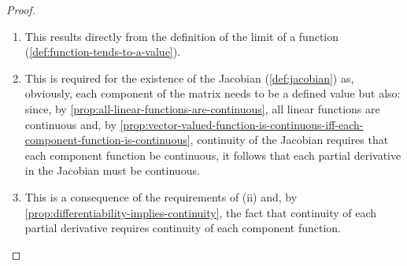 \documentclass[../MathsNotesBase.tex]{subfiles}
\begin{document}
{	
		\bigskip
		\begin{proof}\nl
			\begin{enumerate}[label=(\roman*)]
				\item This results directly from the definition of the limit of a function (\ref{def:function-tends-to-a-value}).
				\item This is required for the existence of the Jacobian (\ref{def:jacobian}) as, obviously, each component of the matrix needs to be a defined value but also: since, by \autoref{prop:all-linear-functions-are-continuous}, all linear functions are continuous and, by \autoref{prop:vector-valued-function-is-continuous-iff-each-component-function-is-continuous}, continuity of the Jacobian requires that each component function be continuous, it follows that each partial derivative in the Jacobian must be continuous.
				\item This is a consequence of the requirements of (ii) and, by \autoref{prop:differentiability-implies-continuity}, the fact that continuity of each partial derivative requires continuity of each component function. 
			\end{enumerate}
		\end{proof}
		
}
\end{document}
